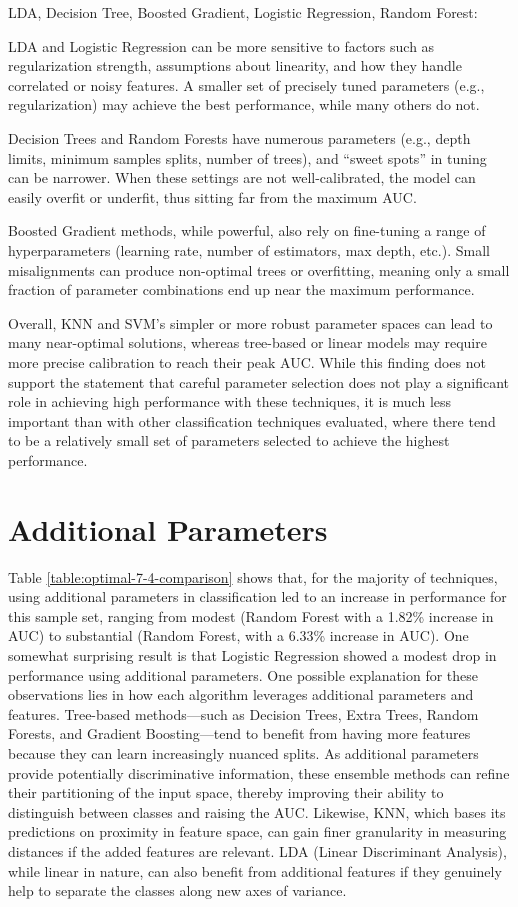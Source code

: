 \documentclass[letterpaper]{report}
\begin{document}
LDA, Decision Tree, Boosted Gradient, Logistic Regression, Random Forest:

LDA and Logistic Regression can be more sensitive to factors such as regularization strength, assumptions about linearity, and how they handle correlated or noisy features. A smaller set of precisely tuned parameters (e.g., regularization) may achieve the best performance, while many others do not.

Decision Trees and Random Forests have numerous parameters (e.g., depth limits, minimum samples splits, number of trees), and “sweet spots” in tuning can be narrower. When these settings are not well-calibrated, the model can easily overfit or underfit, thus sitting far from the maximum AUC.

Boosted Gradient methods, while powerful, also rely on fine-tuning a range of hyperparameters (learning rate, number of estimators, max depth, etc.). Small misalignments can produce non-optimal trees or overfitting, meaning only a small fraction of parameter combinations end up near the maximum performance.

Overall, KNN and SVM’s simpler or more robust parameter spaces can lead to many near-optimal solutions, whereas tree-based or linear models may require more precise calibration to reach their peak AUC. While this finding does not support the statement that careful parameter selection does not play a significant role in achieving high performance with these techniques, it is much less important than with other classification techniques evaluated, where there tend to be a relatively small set of parameters selected to achieve the highest performance.

\section{Additional Parameters}
Table \ref{table:optimal-7-4-comparison} shows that, for the majority of techniques, using additional parameters in classification led to an increase in performance for this sample set, ranging from modest (Random Forest with a 1.82\% increase in AUC) to substantial (Random Forest, with a 6.33\% increase in AUC). One somewhat surprising result is that Logistic Regression showed a modest drop in performance using additional parameters. One possible explanation for these observations lies in how each algorithm leverages additional parameters and features. Tree-based methods—such as Decision Trees, Extra Trees, Random Forests, and Gradient Boosting—tend to benefit from having more features because they can learn increasingly nuanced splits. As additional parameters provide potentially discriminative information, these ensemble methods can refine their partitioning of the input space, thereby improving their ability to distinguish between classes and raising the AUC. Likewise, KNN, which bases its predictions on proximity in feature space, can gain finer granularity in measuring distances if the added features are relevant. LDA (Linear Discriminant Analysis), while linear in nature, can also benefit from additional features if they genuinely help to separate the classes along new axes of variance.
\end{document}
